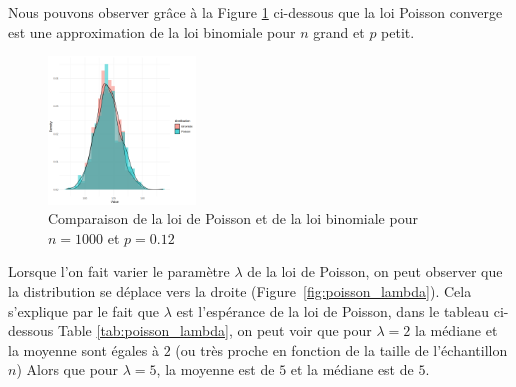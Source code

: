       Nous pouvons observer grâce à la Figure \ref{fig:poisson_binomiale} ci-dessous que la loi Poisson converge est une approximation de la loi binomiale pour $n$ grand et $p$ petit.
      \begin{figure}[H]
        \centering
        \includegraphics[width=0.35\textwidth]{4_attachments/figures/output6.png}
        \caption{Comparaison de la loi de Poisson et de la loi binomiale pour $n=1000$ et $p=0.12$}
        \label{fig:poisson_binomiale}
      \end{figure}

      Lorsque l'on fait varier le paramètre $\lambda$ de la loi de Poisson, on peut observer que la distribution se déplace vers la droite (Figure~\ref{fig:poisson_lambda}). Cela s'explique par le fait que $\lambda$ est l'espérance de la loi de Poisson, dans le tableau ci-dessous Table \ref{tab:poisson_lambda}, on peut voir que pour $\lambda=2$ la médiane et la moyenne sont égales à $2$ (ou très proche en fonction de la taille de l'échantillon $n$)
      Alors que pour $\lambda=5$, la moyenne est de $5$ et la médiane est de $5$.

